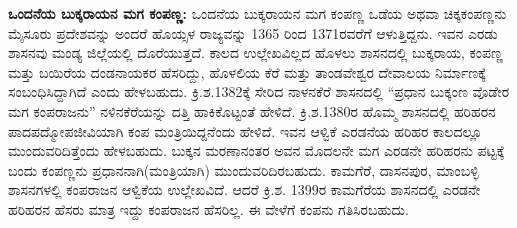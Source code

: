 \textbf{ಒಂದನೆಯ ಬುಕ್ಕರಾಯನ ಮಗ ಕಂಪಣ್ಣ:} ಒಂದನೆಯ ಬುಕ್ಕರಾಯನ ಮಗ ಕಂಪಣ್ಣ ಒಡೆಯ ಅಥವಾ ಚಿಕ್ಕಕಂಪಣ್ಣನು ಮೈಸೂರು ಪ್ರದೇಶವನ್ನು ಅಂದರೆ ಹೊಯ್ಸಳ ರಾಜ್ಯವನ್ನು 1365 ರಿಂದ 1371ರವರೆಗೆ ಆಳುತ್ತಿದ್ದನು. ಇವನ ಎರಡು ಶಾಸನವು ಮಂಡ್ಯ ಜಿಲ್ಲೆಯಲ್ಲಿ ದೊರೆಯುತ್ತದೆ. ಕಾಲದ ಉಲ್ಲೇಖವಿಲ್ಲದ ಹೊಳಲು ಶಾಸನದಲ್ಲಿ ಬುಕ್ಕರಾಯ, ಕಂಪಣ್ಣ ಮತ್ತು ಬಯಿರೆಯ ದಂಡನಾಯಕರ ಹೆಸರಿದ್ದು, ಹೊಳಲಿಯ ಕೆರೆ ಮತ್ತು ತಾಂಡವೇಶ್ವರ ದೇವಾಲಯ ನಿರ್ಮಾಣಕ್ಕೆ ಸಂಬಂಧಿಸಿದ್ದಾಗಿದೆ ಎಂದು ಹೇಳಬಹುದು. ಕ್ರಿ.ಶ.1382ಕ್ಕೆ ಸೇರಿದ ನಾಳನಕೆರೆ ಶಾಸನದಲ್ಲಿ “ಪ್ರಧಾನ ಬುಕ್ಕಂಣ ವೊಡೇರ ಮಗ ಕಂಪರಾಜನು” ನಳಿನಕೆರೆಯನ್ನು ದತ್ತಿ ಹಾಕಿಕೊಟ್ಟಂತೆ ಹೇಳಿದೆ. ಕ್ರಿ.ಶ.1380ರ ಹೊಮ್ಮ ಶಾಸನದಲ್ಲಿ ಹರಿಹರನ ಪಾದಪದ್ಮೋಪಜೀವಿಯಾಗಿ ಕಂಪ ಮಂತ್ರಿಯಿದ್ದನೆಂದು ಹೇಳಿದೆ. ಇವನ ಆಳ್ವಿಕೆ ಎರಡನೆಯ ಹರಿಹರ ಕಾಲದಲ್ಲೂ ಮುಂದುವರಿದಿತ್ತೆಂದು ಹೇಳಬಹುದು. ಬುಕ್ಕನ ಮರಣಾನಂತರ ಅವನ ಮೊದಲನೇ ಮಗ ಎರಡನೇ ಹರಿಹರನು ಪಟ್ಟಕ್ಕೆ ಬಂದು ಕಂಪಣ್ಣನು ಪ್ರಧಾನನಾಗಿ(ಮಂತ್ರಿಯಾಗಿ) ಮುಂದುವರಿದಿರಬಹುದು. ಕಾಮಗೆರೆ, ದಾಸನಪುರ, ಮಾಂಬಳ್ಳಿ ಶಾಸನಗಳಲ್ಲಿ ಕಂಪರಾಜನ ಆಳ್ವಿಕೆಯ ಉಲ್ಲೇಖವಿದೆ. ಆದರೆ ಕ್ರಿ.ಶ. 1399ರ ಕಾಮಗೆರೆಯ ಶಾಸನದಲ್ಲಿ ಎರಡನೇ ಹರಿಹರನ ಹೆಸರು ಮಾತ್ರ ಇದ್ದು ಕಂಪರಾಜನ ಹೆಸರಿಲ್ಲ. ಈ ವೇಳೆಗೆ ಕಂಪನು ಗತಿಸಿರಬಹುದು.

